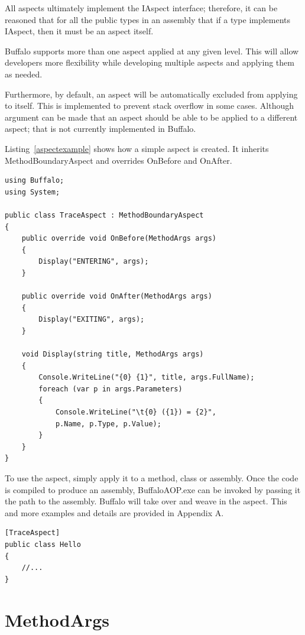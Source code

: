 All aspects ultimately implement the IAspect interface; therefore, it can be reasoned that for all the public types in an assembly that if a type implements IAspect, then it must be an aspect itself.

Buffalo supports more than one aspect applied at any given level. This will allow developers more flexibility while developing multiple aspects and applying them as needed.

Furthermore, by default, an aspect will be automatically excluded from applying to itself. This is implemented to prevent stack overflow in some cases. Although argument can be made that an aspect should be able to be applied to a different aspect; that is not currently implemented in Buffalo.

Listing~\ref{aspectexample} shows how a simple aspect is created. It inherits MethodBoundaryAspect and overrides OnBefore and OnAfter.

\begin{lstlisting}[caption={Sample TraceAspect}, label=aspectexample]
using Buffalo;
using System;

public class TraceAspect : MethodBoundaryAspect
{
    public override void OnBefore(MethodArgs args)
    {
        Display("ENTERING", args);
    }

    public override void OnAfter(MethodArgs args)
    {
        Display("EXITING", args);
    }

    void Display(string title, MethodArgs args)
    {
        Console.WriteLine("{0} {1}", title, args.FullName);
        foreach (var p in args.Parameters)
        {
            Console.WriteLine("\t{0} ({1}) = {2}", 
			p.Name, p.Type, p.Value);
        }
    }
}
\end{lstlisting}

To use the aspect, simply apply it to a method, class or assembly. Once the code is compiled to produce an assembly, BuffaloAOP.exe can be invoked by passing it the path to the assembly. Buffalo will take over and weave in the aspect. This and more examples and details are provided in Appendix A.

\begin{lstlisting}[caption={Apply Aspect on Class Level}, label=helloaspect]
[TraceAspect]
public class Hello
{
	//...
}
\end{lstlisting}

\section{MethodArgs}

